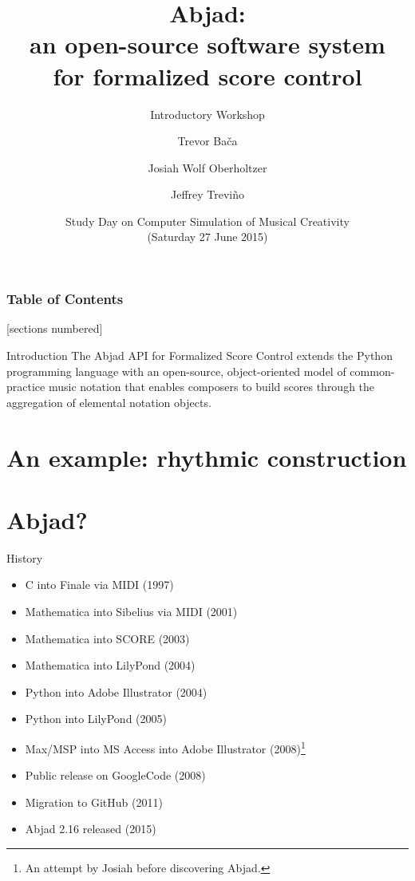 \documentclass[10pt]{beamer}
\title{
    Abjad:\protect\\ 
    an open-source software system\protect\\ 
    for formalized score control
}
\subtitle{Introductory Workshop}
\author{
    Trevor Ba\v{c}a \inst{1} \and 
    Josiah Wolf Oberholtzer \inst{1} \and 
    Jeffrey Trevi\~{n}o \inst{2}
}
\institute[shortinst]{
    \inst{1}Department of Music, Harvard University \and 
    \inst{2} Department of Music, Colorado College
}
\date[CFP 2003]{
    Study Day on Computer Simulation of Musical Creativity\protect\\ 
    (Saturday 27 June 2015)
}
\begin{document}
\maketitle

\begin{frame}
    \frametitle{Table of Contents}
    [sections numbered]
    \tableofcontents[hideallsubsections]
\end{frame}

\begin{frame}{Introduction}
The Abjad API for Formalized Score Control extends the Python programming
language with an open-source, object-oriented model of common-practice music
notation that enables composers to build scores through the aggregation of
elemental notation objects.
\end{frame}

\section{An example: rhythmic construction}

\section{Abjad?}

\begin{frame}{History}
    \begin{itemize}
        \item C into Finale via MIDI (1997)
        \item Mathematica into Sibelius via MIDI (2001)
        \item Mathematica into SCORE (2003)
        \item Mathematica into LilyPond (2004)
        \item Python into Adobe Illustrator (2004)
        \item Python into LilyPond (2005)
        \item Max/MSP into MS Access into Adobe Illustrator (2008)\footnote{
            An attempt by Josiah before discovering Abjad.
            } 
        \item Public release on GoogleCode (2008)
        \item Migration to GitHub (2011)
        \item Abjad 2.16 released (2015)
    \end{itemize}
\end{frame}
\end{document}
